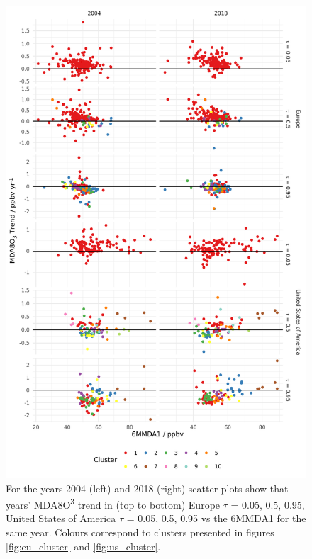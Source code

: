 \documentclass[journal abbreviation, manuscript]{copernicus}
\begin{document}
\clearpage


\begin{figure}[p]
\centering
\includegraphics[height=0.9\textheight]{figures/paper_figures/f09_mda8_cluster_mda8_6mmda1.pdf}
\caption{For the years 2004 (left) and 2018 (right) scatter plots show that years' MDA8O\textsuperscript{3} trend in (top to bottom) Europe $\tau$ = 0.05, 0.5, 0.95, United States of America $\tau$ = 0.05, 0.5, 0.95 vs the 6MMDA1 for the same year. Colours correspond to clusters presented in figures \ref{fig:eu_cluster} and \ref{fig:us_cluster}.}
\label{fig:mda8_cluster_mda8_6mmda1}
\end{figure}
\clearpage
\end{document}
